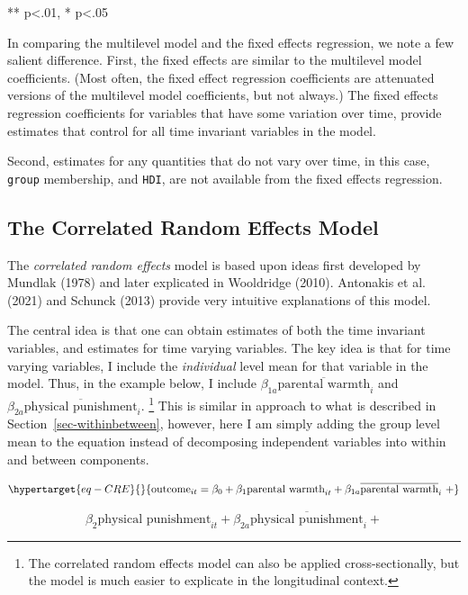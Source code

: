 \documentclass[
  letterpaper,
  DIV=11,
  numbers=noendperiod]{scrreprt}
\begin{document}
** p\textless.01, * p\textless.05

In comparing the multilevel model and the fixed effects regression, we
note a few salient difference. First, the fixed effects are similar to
the multilevel model coefficients. (Most often, the fixed effect
regression coefficients are attenuated versions of the multilevel model
coefficients, but not always.) The fixed effects regression coefficients
for variables that have some variation over time, provide estimates that
control for all time invariant variables in the model.

Second, estimates for any quantities that do not vary over time, in this
case, \texttt{group} membership, and \texttt{HDI}, are not available
from the fixed effects regression.

\hypertarget{the-correlated-random-effects-model}{%
\subsection{The Correlated Random Effects
Model}\label{the-correlated-random-effects-model}}

The \emph{correlated random effects} model is based upon ideas first
developed by Mundlak (1978) and later explicated in Wooldridge (2010).
Antonakis et al. (2021) and Schunck (2013) provide very intuitive
explanations of this model.

The central idea is that one can obtain estimates of both the time
invariant variables, and estimates for time varying variables. The key
idea is that for time varying variables, I include the \emph{individual}
level mean for that variable in the model. Thus, in the example below, I
include \(\beta_{1a}\overline{\text{parental warmth}}_{i}\) and
\(\beta_{2a}\overline{\text{physical punishment}}_{i}\). \footnote{The
  correlated random effects model can also be applied cross-sectionally,
  but the model is much easier to explicate in the longitudinal context.}
This is similar in approach to what is described in
Section~\ref{sec-withinbetween}, however, here I am simply adding the
group level mean to the equation instead of decomposing independent
variables into within and between components.

\begin{equation}\protect\hypertarget{eq-CRE}{}{\text{outcome}_{it} = \beta_0 + \beta_1 \text{parental warmth}_{it} + \beta_{1a}\overline{\text{parental warmth}}_{i} \ + }\label{eq-CRE}\end{equation}

\[\beta_2 \text{physical punishment}_{it} + \beta_{2a}\overline{\text{physical punishment}}_{i} + \]
\end{document}
